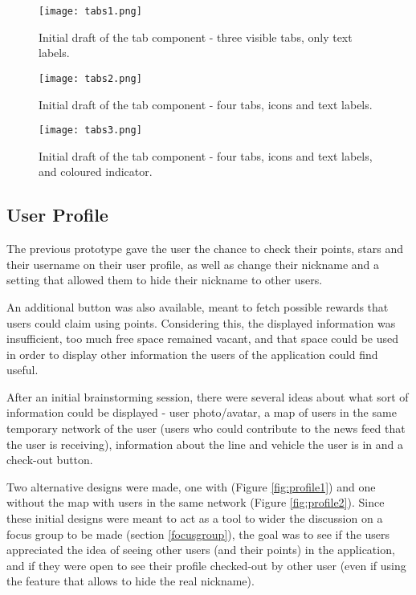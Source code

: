 \begin{figure}[h!]
  \begin{center}
    \leavevmode
    \texttt{[image: tabs1.png]}
    \caption{Initial draft of the tab component - three visible tabs, only text labels.}
    \label{fig:tabs1}
  \end{center}
\end{figure}

\begin{figure}[h!]
  \begin{center}
    \leavevmode
    \texttt{[image: tabs2.png]}
    \caption{Initial draft of the tab component - four tabs, icons and text labels.}
    \label{fig:tabs2}
  \end{center}
\end{figure}

\begin{figure}[h!]
  \begin{center}
    \leavevmode
    \texttt{[image: tabs3.png]}
    \caption{Initial draft of the tab component - four tabs, icons and text labels, and coloured indicator.}
    \label{fig:tabs3}
  \end{center}
\end{figure}

\subsection{User Profile}

The previous prototype gave the user the chance to check their points, stars and their username on their user profile, as well as change their nickname and a setting that allowed them to hide their nickname to other users. 

An additional button was also available, meant to fetch possible rewards that users could claim using points. Considering this, the displayed information was insufficient, too much free space remained vacant, and that space could be used in order to display other information the users of the application could find useful.

After an initial brainstorming session, there were several ideas about what sort of information could be displayed - user photo/avatar, a map of users in the same temporary network of the user (users who could contribute to the news feed that the user is receiving), information about the line and vehicle the user is in and a check-out button.

Two alternative designs were made, one with (Figure \ref{fig:profile1}) and one without the map with users in the same network (Figure \ref{fig:profile2}). Since these initial designs were meant to act as a tool to wider the discussion on a focus group to be made (section \ref{focusgroup}), the goal was to see if the users appreciated the idea of seeing other users (and their points) in the application, and if they were open to see their profile checked-out by other user (even if using the feature that allows to hide the real nickname).


